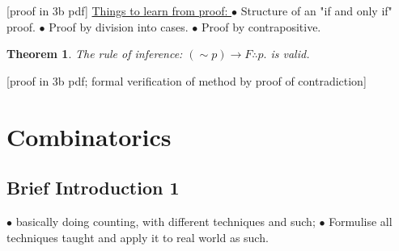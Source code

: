 \documentclass{article}
\newtheorem{theorem}{Theorem}                                       %
\begin{document}
[proof in 3b pdf]
\newline
\newline
\underline{Things to learn from proof: }
\newline 
$\bullet $ Structure of an "if and only if" proof.
\newline
$\bullet $ Proof by division into cases.
\newline
$\bullet $ Proof by contrapositive.
\newline
{}
\newline
\newline
\begin{theorem}
  The rule of inference: $(\sim p) \longrightarrow F \therefore p.$ is valid.
\end{theorem}
[proof in 3b pdf; formal verification of method by proof of contradiction]
\newline
{}
\newpage
\section{Combinatorics}
\subsection{Brief Introduction 1}
$\bullet $ basically doing counting, with different techniques and such; 
\newline
\newline
$\bullet $ Formulise all techniques taught and apply it to real world as such.
\newpage
\end{document}
